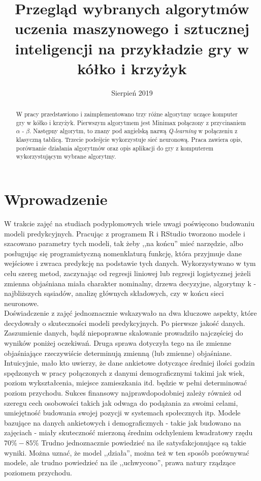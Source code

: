 \documentclass[licencjacka]{pracamgr}
\title{Przegląd wybranych algorytmów uczenia maszynowego i sztucznej inteligencji na przykładzie gry w kółko i krzyżyk}
\date{Sierpień 2019}
\begin{document}
\maketitle
\begin{abstract}
  W pracy przedstawiono i zaimplementowano trzy różne algorytmy uczące komputer gry w kółko i krzyżyk. Pierwszym algorytmem jest Minimax połączony z przycinaniem $\alpha$ - $\beta$. Następny algorytm, to znany pod angielską nazwą \textit{Q-learning} w połączeniu z  klasyczną tablicą. Trzecie podeśjcie wykorzystuje sieć neuronową. Praca zawiera opis, porównanie działania algorytmów oraz opis aplikacji do gry z komputerem wykorzystującym wybrane algorytmy.
\end{abstract}

\tableofcontents


\chapter*{Wprowadzenie}

W trakcie zajęć na studiach podyplomowych wiele uwagi poświęcono budowaniu modeli predykcyjnych. Pracując z  programem R  i RStudio tworzono modele i szacowano parametry tych modeli, tak żeby ,,na końcu'' mieć narzędzie, albo posługując się programistyczną nomenklaturą funkcję, która przyjmuje dane wejściowe i zwraca predykcję na podstawie tych danych. Wykorzystywano w tym celu szereg metod, zaczynając od regresji liniowej lub regresji logistycznej jeżeli zmienna objaśniana miała charakter nominalny, drzewa decyzyjne,  algorytmy k - najbliższych sąsiadów, analizę głównych składowych, czy w końcu sieci neuronowe.  \\

Doświadczenie z zajęć jednoznacznie wskazywało na dwa kluczowe aspekty, które decydowały o skuteczności modeli predykcyjnych. Po pierwsze jakość danych. Zaszumienie danych, bądź niepoprawne skalowanie prowadziło najczęściej do wyników poniżej oczekiwań. Druga sprawa dotyczyła tego na ile zmienne objaśniające rzeczywiście determinują zmienną (lub zmienne) objaśniane. Intuicyjnie, mało kto uwierzy, że dane ankietowe dotyczące średniej ilości godzin spędzonych w pracy połączonych z danymi demograficznymi takimi jak wiek, poziom wykształcenia, miejsce zamieszkania itd. będzie w pełni determinować poziom przychodu. Sukces finansowy najprawdopodobniej zależy również od szeregu cech osobowości takich jak odwaga do podążania za swoimi celami, umiejętność budowania swojej pozycji w systemach społecznych itp.  Modele bazujące na danych ankietowych i demograficznych - takie jak budowano na zajęciach - miały skuteczność mierzoną średnim odchyleniem kwadratowy rzędu $70\% - 85\%$  Trudno jednoznacznie powiedzieć na ile satysfakcjonujące są takie wyniki. Można uznać, że model ,,działa'', można też w ten sposób porównywać modele, ale trudno powiedzieć na ile ,,uchwycono'',  prawa natury rządzące poziomem przychodu.\\
 
\end{document}
